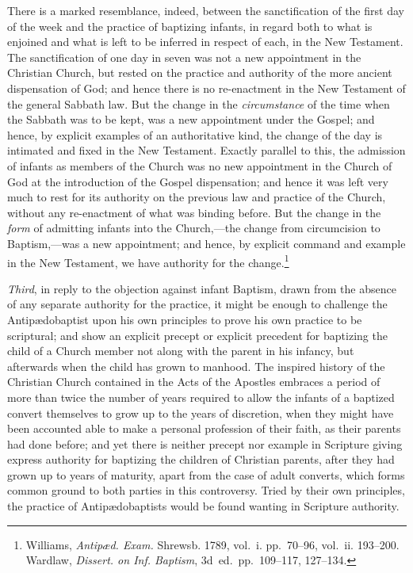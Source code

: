 \documentclass[
]{book}
\begin{document}
There is a marked resemblance, indeed, between the sanctification of the first day of the week and the practice of baptizing infants, in regard both to what is enjoined and what is left to be inferred in respect of each, in the New Testament. The sanctification of one day in seven was not a new appointment in the Christian Church, but rested on the practice and authority of the more ancient dispensation of God; and hence there is no re-enactment in the New Testament of the general Sabbath law. But the change in the \emph{circumstance} of the time when the Sabbath was to be kept, was a new appointment under the Gospel; and hence, by explicit examples of an authoritative kind, the change of the day is intimated and fixed in the New Testament. Exactly parallel to this, the admission of infants as members of the Church was no new appointment in the Church of God at the introduction of the Gospel dispensation; and hence it was left very much to rest for its authority on the previous law and practice of the Church, without any re-enactment of what was binding before. But the change in the \emph{form} of admitting infants into the Church,---the change from circumcision to Baptism,---was a new appointment; and hence, by explicit command and example in the New Testament, we have authority for the change.\footnote{Williams, \emph{Antipæd. Exam.} Shrewsb. 1789, vol.~i. pp.~70--96, vol.~ii. 193--200. Wardlaw, \emph{Dissert. on Inf. Baptism}, 3d~ed.~pp.~109--117, 127--134.}

\emph{Third}, in reply to the objection against infant Baptism, drawn from the absence of any separate authority for the practice, it might be enough to challenge the Antipædobaptist upon his own principles to prove his own practice to be scriptural; and show an explicit precept or explicit precedent for baptizing the child of a Church member not along with the parent in his infancy, but afterwards when the child has grown to manhood. The inspired history of the Christian Church contained in the Acts of the Apostles embraces a period of more than twice the number of years required to allow the infants of a baptized convert themselves to grow up to the years of discretion, when they might have been accounted able to make a personal profession of their faith, as their parents had done before; and yet there is neither precept nor example in Scripture giving express authority for baptizing the children of Christian parents, after they had grown up to years of maturity, apart from the case of adult converts, which forms common ground to both parties in this controversy. Tried by their own principles, the practice of Antipædobaptists would be found wanting in Scripture authority.
\end{document}
